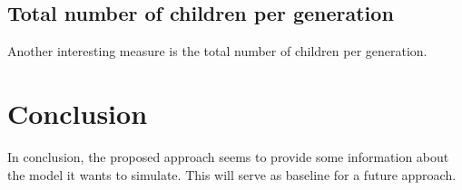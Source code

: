 \documentclass[conference]{IEEEtran}
\begin{document}


    \subsection{Total number of children per generation}


        Another interesting measure is the total number of children per generation.


    
\section{Conclusion}

In conclusion, the proposed approach seems to provide some information about the model it wants to simulate. This will serve as baseline for a future approach.

%
%
\end{document}
